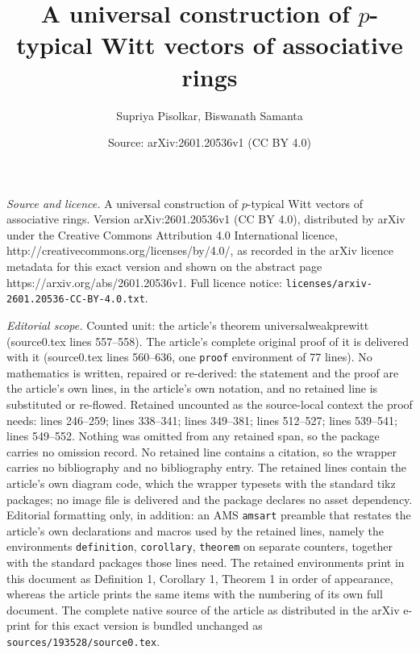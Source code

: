 \documentclass[10pt,a4paper]{amsart}
\title{A universal construction of $p$-typical Witt vectors of associative rings}
\author{Supriya Pisolkar, Biswanath Samanta}
\date{Source: arXiv:2601.20536v1 (CC BY 4.0)}
\begin{document}
\maketitle

\noindent\emph{Source and licence.} A universal construction of $p$-typical Witt vectors of associative rings. Version arXiv:2601.20536v1 (CC BY 4.0), distributed by arXiv under the Creative Commons Attribution 4.0 International licence, http://creativecommons.org/licenses/by/4.0/, as recorded in the arXiv licence metadata for this exact version and shown on the abstract page https://arxiv.org/abs/2601.20536v1. Full licence notice: \texttt{licenses/arxiv-2601.20536-CC-BY-4.0.txt}.\par\smallskip

\noindent\textit{Editorial scope.} Counted unit: the article's theorem universalweakprewitt (source0.tex lines 557--558). The article's complete original proof of it is delivered with it (source0.tex lines 560--636, one \texttt{proof} environment of 77 lines). No mathematics is written, repaired or re-derived: the statement and the proof are the article's own lines, in the article's own notation, and no retained line is substituted or re-flowed.  Retained uncounted as the source-local context the proof needs: lines 246--259; lines 338--341; lines 349--381; lines 512--527; lines 539--541; lines 549--552.  Nothing was omitted from any retained span, so the package carries no omission record.  No retained line contains a citation, so the wrapper carries no bibliography and no bibliography entry.  The retained lines contain the article's own diagram code, which the wrapper typesets with the standard tikz packages; no image file is delivered and the package declares no asset dependency.  Editorial formatting only, in addition: an AMS \texttt{amsart} preamble that restates the article's own declarations and macros used by the retained lines, namely the environments \texttt{definition}, \texttt{corollary}, \texttt{theorem} on separate counters, together with the standard packages those lines need.  The retained environments print in this document as Definition 1, Corollary 1, Theorem 1 in order of appearance, whereas the article prints the same items with the numbering of its own full document.  The complete native source of the article as distributed in the arXiv e-print for this exact version is bundled unchanged as \texttt{sources/193528/source0.tex}.
\end{document}
